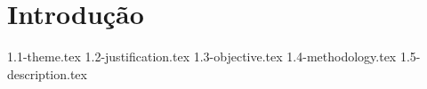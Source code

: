 \chapter{Introdução}\label{cap_introducao}

{1.1-theme.tex}
{1.2-justification.tex}
{1.3-objective.tex}
{1.4-methodology.tex}
{1.5-description.tex}